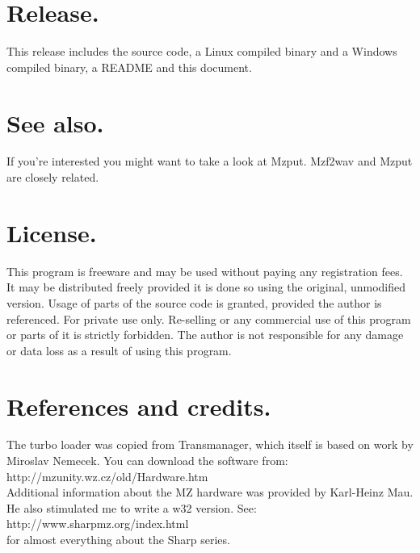 \documentclass{article}
\begin{document}
\section{Release.}
This release includes the source code, a Linux compiled binary and a Windows 
compiled binary, a README and this document. 

\section{See also.}
If you're interested you might want to take a look at Mzput. Mzf2wav and Mzput
are closely related.

\section{License.}
This program is freeware and may be used without paying any registration fees.
It may be distributed freely provided it is done so using the original, 
unmodified version. Usage of parts of the source code is granted, provided the 
author is referenced. For private use only. Re-selling or any commercial use of
this program or parts of it is strictly forbidden. The author is not 
responsible for any damage or data loss as a result of using this program.

\section{References and credits.}
The turbo loader was copied from Transmanager, which itself is based on work 
by Miroslav Nemecek. You can download the software from: \\
http://mzunity.wz.cz/old/Hardware.htm \\
Additional information about the MZ hardware was provided by Karl-Heinz Mau. 
He also stimulated me to write a w32 version. See: \\
http://www.sharpmz.org/index.html \\ 
for almost everything about the Sharp series.
\end{document}
